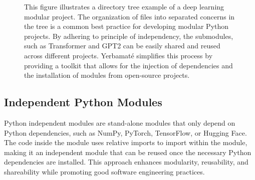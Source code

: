 

\begin{figure}
\centering
{}
\caption{
This figure illustrates a directory tree example of a deep learning modular project. The organization of files into separated concerns in the tree is a common best practice for developing modular Python projects. By adhering to principle of independency, the submodules, such as Transformer and GPT2 can be easily shared and reused across different projects. Yerbamaté simplifies this process by providing a toolkit that allows for the injection of dependencies and the installation of modules from open-source projects.
}
\end{figure}


\subsection{Independent Python Modules}

Python independent modules are stand-alone modules that only depend on Python dependencies, such as NumPy, PyTorch, TensorFlow, or Hugging Face. The code inside the module uses relative imports to import within the module, making it an independent module that can be reused once the necessary Python dependencies are installed. This approach enhances modularity, reusability, and shareability while promoting good software engineering practices.

